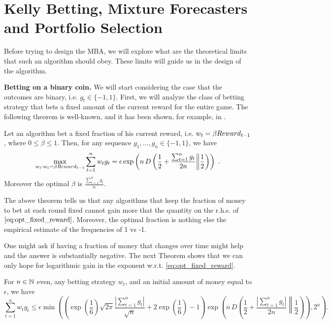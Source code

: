\section{Kelly Betting, Mixture Forecasters and Portfolio Selection}
\label{sec:kelly}

Before trying to design the \ac{MBA}, we will explore what are the theoretical limits that such an algorithm should obey. These limits will guide us in the design of the algorithm.

\textbf{Betting on a binary coin.}
We will start considering the case that the outcomes are binary, i.e. $g_t \in \{-1,1\}$.
First, we will analyze the class of betting strategy that bets a fixed amount of the current reward for the entire game.
The following theorem is well-known, and it has been shown, for example, in \cite{}.

\begin{theorem}
\label{thm:oracle_fraction}
Let an algorithm bet a fixed fraction of his current reward, i.e. $w_t=\beta Reward_{t-1}$, where $0\leq\beta\leq1$. Then, for any sequence $g_1, \ldots, g_n \in \{-1,1\}$, we have
\begin{equation}
\label{eq:opt_fixed_reward}
\max_{w_t: w_t=\beta Reward_{t-1}} \sum_{t=1}^n w_t g_t 
= \epsilon \exp\left(n\, D\left(\frac{1}{2}+\frac{\sum_{t=1}^n g_t}{2 n}\middle\|\frac{1}{2}\right)\right)~. 
\end{equation}
Moreover the optimal $\beta$ is $\frac{\sum_{t=1}^n g_t}{n}$.
\end{theorem}

The above theorem tells us that any algorithms that keep the fraction of money to bet at each round fixed cannot gain more that the quantity on the r.h.s. of $\eqref{eq:opt_fixed_reward}$. Moreover, the optimal fraction is nothing else the empirical estimate of the frequencies of 1 vs -1.

One might ask if having a fraction of money that changes over time might help and the answer is substantially negative. The next Theorem shows that we can only hope for logarithmic gain in the exponent w.r.t. \eqref{eq:opt_fixed_reward}.
\begin{theorem}
\label{thm:oracle_fraction_changing}
For $n \in \mathbb{N}$ even, any betting strategy $w_t$, and an initial amount of money equal to $\epsilon$, we have
\[
\sum_{t=1}^n w_t g_t 
\leq \epsilon \min\left(\left(\exp\left(\frac{1}{6}\right)\sqrt{2 \pi}\frac{|\sum_{t=1}^n g_t|}{\sqrt{n}} +2\exp\left(\frac{1}{6}\right)-1\right) \exp\left(n\, D\left(\frac{1}{2}+\frac{|\sum_{t=1}^n g_t|}{2 n}\middle\|\frac{1}{2}\right)\right), 2^n\right).
\]
\end{theorem}

